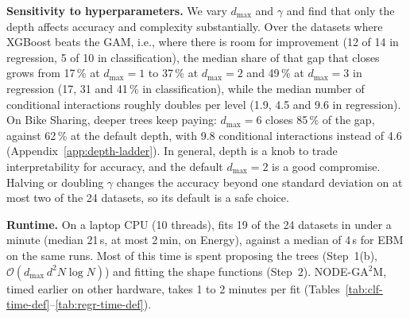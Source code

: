 \textbf{Sensitivity to hyperparameters.}
We vary $d_{\max}$ and $\gamma$ and find that only the depth affects accuracy and complexity substantially.
Over the datasets where XGBoost beats the GAM, i.e., where there is room for improvement (12 of 14 in regression, 5 of 10 in classification), the median share of that gap that \method{} closes grows from 17\,\% at $d_{\max}=1$ to 37\,\% at $d_{\max}=2$ and 49\,\% at $d_{\max}=3$ in regression (17, 31 and 41\,\% in classification), while the median number of conditional interactions roughly doubles per level (1.9, 4.5 and 9.6 in regression).
On Bike Sharing, deeper trees keep paying: $d_{\max}=6$ closes 85\,\% of the gap, against 62\,\% at the default depth, with 9.8 conditional interactions instead of 4.6 (Appendix~\ref{app:depth-ladder}).
In general, depth is a knob to trade interpretability for accuracy, and the default $d_{\max}=2$ is a good compromise.
Halving or doubling $\gamma$ changes the accuracy beyond one standard deviation on at most two of the 24 datasets, so its default is a safe choice.

\textbf{Runtime.}
On a laptop CPU (10 threads), \method{} fits 19 of the 24 datasets in under a minute (median 21\,s, at most 2\,min, on Energy), against a median of 4\,s for EBM on the same runs.
Most of this time is spent proposing the trees (Step~1(b), $\mathcal{O}(d_{\max}\, d^2 N \log N)$) and fitting the shape functions (Step~2).
NODE-GA$^2$M, timed earlier on other hardware, takes 1 to 2 minutes per fit (Tables~\ref{tab:clf-time-def}--\ref{tab:regr-time-def}).

